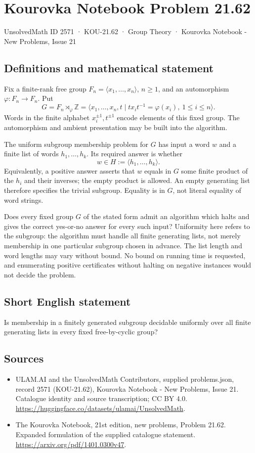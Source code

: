 \documentclass[11pt,a4paper]{article}
\begin{document}
\section*{Kourovka Notebook Problem 21.62}\label{2571}
{\small UnsolvedMath ID 2571 · KOU-21.62 · Group Theory · Kourovka Notebook - New Problems, Issue 21}
\subsection{Definitions and mathematical statement}
Fix a finite-rank free group $F_n=\langle x_1,\ldots,x_n\rangle$,
$n\ge1$, and an automorphism $\varphi:F_n\to F_n$. Put
\[
 G=F_n\rtimes_\varphi\mathbb Z
 =\langle x_1,\ldots,x_n,t\mid
       tx_it^{-1}=\varphi(x_i),\ 1\le i\le n\rangle.
\]
Words in the finite alphabet $x_i^{\pm1},t^{\pm1}$ encode elements of
this fixed group. The automorphism and ambient presentation may be
built into the algorithm.

The uniform subgroup membership problem for $G$ has input a word $w$
and a finite list of words $h_1,\ldots,h_k$. Its required answer is
whether
\[
 w\in H:=\langle h_1,\ldots,h_k\rangle.
\]
Equivalently, a positive answer asserts that $w$ equals in $G$ some
finite product of the $h_i$ and their inverses; the empty product is
allowed. An empty generating list therefore specifies the trivial
subgroup. Equality is in $G$, not literal equality of word strings.

Does every fixed group $G$ of the stated form admit an algorithm
which halts and gives the correct yes-or-no answer for every such
input? Uniformity here refers to the subgroup: the algorithm must
handle all finite generating lists, not merely membership in one
particular subgroup chosen in advance. The list length and word
lengths may vary without bound. No bound on running time is requested,
and enumerating positive certificates without halting on negative
instances would not decide the problem.
\subsection{Short English statement}
Is membership in a finitely generated subgroup decidable uniformly over all finite generating lists in every fixed free-by-cyclic group?
\subsection{Sources}
\begin{itemize}
\item[S1] ULAM.AI and the UnsolvedMath Contributors, supplied problems.json, record 2571 (KOU-21.62), Kourovka Notebook - New Problems, Issue 21. Catalogue identity and source transcription; CC BY 4.0.
\url{https://huggingface.co/datasets/ulamai/UnsolvedMath}.
\item[S2] The Kourovka Notebook, 21st edition, new problems, Problem 21.62. Expanded formulation of the supplied catalogue statement.
\url{https://arxiv.org/pdf/1401.0300v47}.
\end{itemize}
\end{document}
